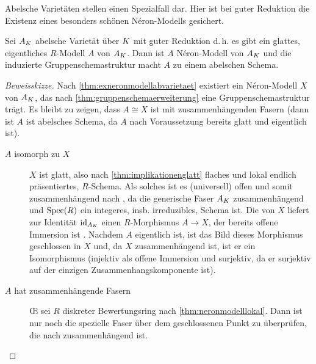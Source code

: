 \documentclass[german]{scrreprt}
\begin{document}
Abelsche Varietäten stellen einen Spezialfall dar. Hier ist bei guter
Reduktion die Existenz eines besonders schönen Néron-Modells gesichert.
\begin{Satz}\label{thm:abelscheneronmodelle}
  \cite[1.4, Proposition 2]{neron}
  Sei $A_{K}$ abelsche Varietät über $K$ mit guter Reduktion
  d.\,h. es gibt ein glattes, eigentliches $R$-Modell $A$ von $A_{K}$.
  Dann ist $A$ Néron-Modell von $A_{K}$ und die induzierte
  Gruppenschemastruktur macht $A$ zu einem abelschen Schema.
  \begin{proof}[Beweisskizze]
    Nach \autoref{thm:exneronmodellabvarietaet} existiert ein
    Néron-Modell $X$ von $A_{K}$, das nach
    \autoref{thm:gruppenschemaerweiterung} eine Gruppenschemastruktur
    trägt.
    Es bleibt zu zeigen, dass $A\cong X$ ist
    mit zusammenhängenden Fasern (dann ist $A$ ist abelsches Schema,
    da $A$ nach Voraussetzung bereits glatt und eigentlich ist).
    \begin{description}
    \item[$A$ isomorph zu $X$] $X$ ist glatt, also nach
      \autoref{thm:implikationenglatt} flaches und lokal endlich
      präsentiertes, $R$-Schema.
      Als solches ist es (universell) offen \cite[Theorem 14.33]{wedhorn}
      und somit zusammenhängend nach \cite[Proposition 3.24]{wedhorn},
      da die generische Faser $A_{K}$ zusammenhängend und $\operatorname{Spec}(R)$
      ein integeres, insb. irreduzibles, Schema ist.
      Die \NAbbEig von $X$ liefert zur Identität $\mathrm{id}_{A_{K}}$ einen
      $R$-Morphismus $A\to X$, der bereits offene Immersion ist
      \cite[4.3/1 (ii) oder 4.4/1]{neron}.
      Nachdem $A$ eigentlich ist, ist das Bild dieses Morphismus
      geschlossen in $X$ und, da $X$ zusammenhängend ist, ist er ein
      Isomorphismus (injektiv als offene Immersion und surjektiv, da
      er surjektiv auf der einzigen Zusammenhangskomponente ist).
    \item[$A$ hat zusammenhängende Fasern]
      \OE{} sei $R$ diskreter Bewertungsring nach
      \autoref{thm:neronmodelllokal}.
      Dann ist nur noch die spezielle Faser über dem geschlossenen
      Punkt zu überprüfen, die nach \cite[5.5.1]{EGAIII-1} zusammenhängend
      ist.
    \end{description}
  \end{proof}
\end{Satz}
\end{document}
